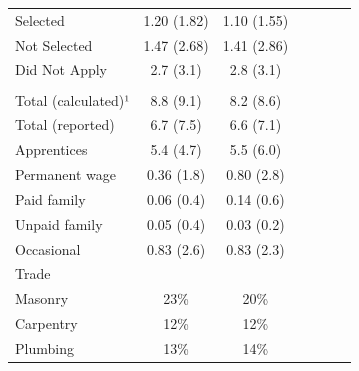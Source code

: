 \documentclass[
  a4paper, twoside, 12pt]{book}
\begin{document}
\begin{singlespacing}
\begin{table}[H]
{\begin{threeparttable}
\begin{tabular}[t]{lcccccc}
\hspace{1em}\hspace{1em}Selected & 1.20 (1.82) & 1.10 (1.55) &  &  &  & \\
\hspace{1em}\hspace{1em}Not Selected & 1.47 (2.68) & 1.41 (2.86) &  &  &  & \\
\hspace{1em}\hspace{1em}Did Not Apply & 2.7 (3.1) & 2.8 (3.1) &  &  &  & \\
\addlinespace[0.3em]
\multicolumn{7}{l}{\hspace{1em}Firm size}\\
\hspace{1em}\hspace{1em}Total (calculated)¹ & 8.8 (9.1) & 8.2 (8.6) &  &  &  & \\
\hspace{1em}\hspace{1em}Total (reported) & 6.7 (7.5) & 6.6 (7.1) &  &  &  & \\
\hspace{1em}\hspace{1em}Apprentices & 5.4 (4.7) & 5.5 (6.0) &  &  &  & \\
\hspace{1em}\hspace{1em}Permanent wage & 0.36 (1.8) & 0.80 (2.8) &  &  &  & \\
\hspace{1em}\hspace{1em}Paid family & 0.06 (0.4) & 0.14 (0.6) &  &  &  & \\
\hspace{1em}\hspace{1em}Unpaid family & 0.05 (0.4) & 0.03 (0.2) &  &  &  & \\
\hspace{1em}\hspace{1em}Occasional & 0.83 (2.6) & 0.83 (2.3) &  &  &  & \\
\hspace{1em}Trade &  &  &  &  &  & \\
\hspace{1em}\hspace{1em}Masonry & 23\% & 20\% &  &  &  & \\
\hspace{1em}\hspace{1em}Carpentry & 12\% & 12\% &  &  &  & \\
\hspace{1em}\hspace{1em}Plumbing & 13\% & 14\% &  &  &  & \\

\end{tabular}
\end{threeparttable}}
\end{table}
\end{singlespacing}
\end{document}
